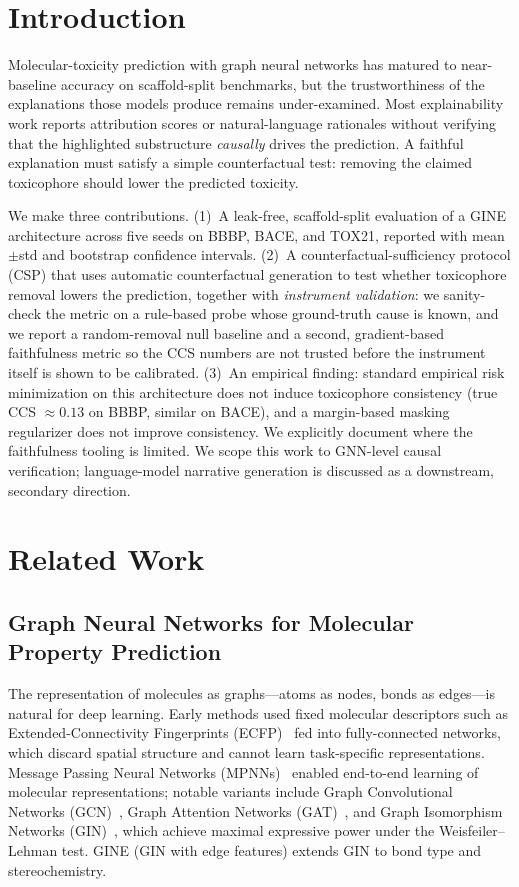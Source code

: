 \documentclass[conference]{IEEEtran}
\begin{document}
\section{Introduction}
Molecular-toxicity prediction with graph neural networks has matured to near-baseline accuracy on scaffold-split benchmarks, but the trustworthiness of the explanations those models produce remains under-examined. Most explainability work reports attribution scores or natural-language rationales without verifying that the highlighted substructure \emph{causally} drives the prediction. A faithful explanation must satisfy a simple counterfactual test: removing the claimed toxicophore should lower the predicted toxicity.

We make three contributions. (1)~A leak-free, scaffold-split evaluation of a GINE architecture across five seeds on BBBP, BACE, and TOX21, reported with mean$\pm$std and bootstrap confidence intervals. (2)~A counterfactual-sufficiency protocol (CSP) that uses automatic counterfactual generation to test whether toxicophore removal lowers the prediction, together with \emph{instrument validation}: we sanity-check the metric on a rule-based probe whose ground-truth cause is known, and we report a random-removal null baseline and a second, gradient-based faithfulness metric so the CCS numbers are not trusted before the instrument itself is shown to be calibrated. (3)~An empirical finding: standard empirical risk minimization on this architecture does not induce toxicophore consistency (true CCS $\approx 0.13$ on BBBP, similar on BACE), and a margin-based masking regularizer does not improve consistency. We explicitly document where the faithfulness tooling is limited. We scope this work to GNN-level causal verification; language-model narrative generation is discussed as a downstream, secondary direction.

\section{Related Work}
\subsection{Graph Neural Networks for Molecular Property Prediction}
The representation of molecules as graphs---atoms as nodes, bonds as edges---is natural for deep learning. Early methods used fixed molecular descriptors such as Extended-Connectivity Fingerprints (ECFP)~\cite{rogers2010extended} fed into fully-connected networks, which discard spatial structure and cannot learn task-specific representations. Message Passing Neural Networks (MPNNs)~\cite{gilmer2017neural} enabled end-to-end learning of molecular representations; notable variants include Graph Convolutional Networks (GCN)~\cite{kipf2017semi}, Graph Attention Networks (GAT)~\cite{velivckovic2018graph}, and Graph Isomorphism Networks (GIN)~\cite{xu2019powerful}, which achieve maximal expressive power under the Weisfeiler--Lehman test. GINE (GIN with edge features) extends GIN to bond type and stereochemistry.
\end{document}
